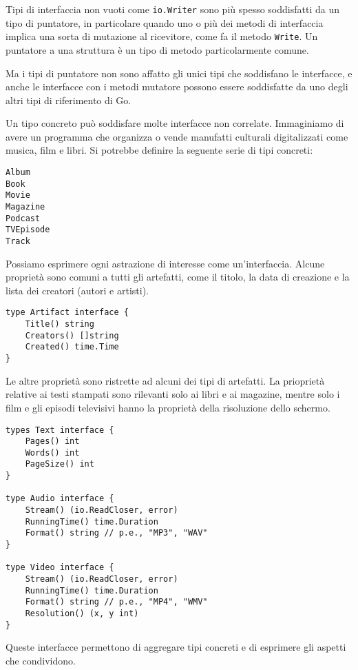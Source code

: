 \documentclass[../../thesis.tex]{subfiles}
\begin{document}
    Tipi di interfaccia non vuoti come \verb"io.Writer" sono più spesso soddisfatti da un tipo di puntatore, in particolare quando uno o più dei metodi di interfaccia implica una sorta di mutazione al ricevitore, come fa il metodo \verb"Write".
    Un puntatore a una struttura è un tipo di metodo particolarmente comune.
    \hfill \vspace{12pt}

    Ma i tipi di puntatore non sono affatto gli unici tipi che soddisfano le interfacce, e anche le interfacce con i metodi mutatore possono essere soddisfatte da uno degli altri tipi di riferimento di Go.
    \hfill \vspace{12pt}

    Un tipo concreto può soddisfare molte interfacce non correlate.
    Immaginiamo di avere un programma che organizza o vende manufatti culturali digitalizzati come musica, film e libri.
    Si potrebbe definire la seguente serie di tipi concreti:
    \begin{lstlisting}[frame = single,label={lst:lstlisting6-3.4}]
Album
Book
Movie
Magazine
Podcast
TVEpisode
Track
    \end{lstlisting}
    Possiamo esprimere ogni astrazione di interesse come un'interfaccia.
    Alcune proprietà sono comuni a tutti gli artefatti, come il titolo, la data di creazione e la lista dei creatori (autori e artisti).
    \begin{lstlisting}[frame = single,label={lst:lstlisting6-3.5}]
type Artifact interface {
    Title() string
    Creators() []string
    Created() time.Time
}
    \end{lstlisting}
    Le altre proprietà sono ristrette ad alcuni dei tipi di artefatti.
    La prioprietà relative ai testi stampati sono rilevanti solo ai libri e ai magazine, mentre solo i film e gli episodi televisivi hanno la proprietà della risoluzione dello schermo.
    \begin{lstlisting}[frame = single,label={lst:lstlisting6-3.6}]
types Text interface {
    Pages() int
    Words() int
    PageSize() int
}

type Audio interface {
    Stream() (io.ReadCloser, error)
    RunningTime() time.Duration
    Format() string // p.e., "MP3", "WAV"
}

type Video interface {
    Stream() (io.ReadCloser, error)
    RunningTime() time.Duration
    Format() string // p.e., "MP4", "WMV"
    Resolution() (x, y int)
}
    \end{lstlisting}
    Queste interfacce permettono di aggregare tipi concreti e di esprimere gli aspetti che condividono.
\end{document}
